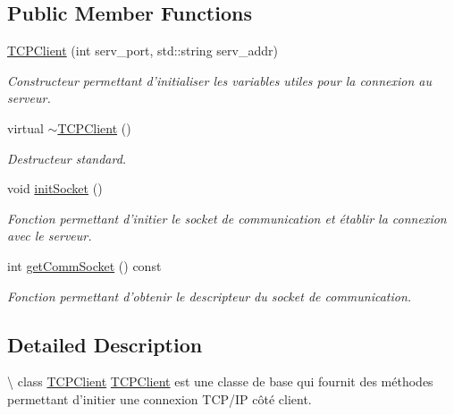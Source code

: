 \subsection*{Public Member Functions}
\begin{DoxyCompactItemize}
\item 
\hyperlink{classTCPClient_a57b75116cbba7c8b50e26e78642f0d56}{T\-C\-P\-Client} (int serv\-\_\-port, std\-::string serv\-\_\-addr)
\begin{DoxyCompactList}\small\item\em Constructeur permettant d'initialiser les variables utiles pour la connexion au serveur. \end{DoxyCompactList}\item 
\hypertarget{classTCPClient_a869a5b3319ca562d03cb4c59ebec4407}{virtual \hyperlink{classTCPClient_a869a5b3319ca562d03cb4c59ebec4407}{$\sim$\-T\-C\-P\-Client} ()}\label{classTCPClient_a869a5b3319ca562d03cb4c59ebec4407}

\begin{DoxyCompactList}\small\item\em Destructeur standard. \end{DoxyCompactList}\item 
\hypertarget{classTCPClient_a2c3b52fb65b17db330ce851a1111c221}{void \hyperlink{classTCPClient_a2c3b52fb65b17db330ce851a1111c221}{init\-Socket} ()}\label{classTCPClient_a2c3b52fb65b17db330ce851a1111c221}

\begin{DoxyCompactList}\small\item\em Fonction permettant d'initier le socket de communication et établir la connexion avec le serveur. \end{DoxyCompactList}\item 
\hypertarget{classTCPClient_a2acc4f58389c670672c6373b5375cb36}{int \hyperlink{classTCPClient_a2acc4f58389c670672c6373b5375cb36}{get\-Comm\-Socket} () const }\label{classTCPClient_a2acc4f58389c670672c6373b5375cb36}

\begin{DoxyCompactList}\small\item\em Fonction permettant d'obtenir le descripteur du socket de communication. \end{DoxyCompactList}\end{DoxyCompactItemize}


\subsection{Detailed Description}
\textbackslash{} class \hyperlink{classTCPClient}{T\-C\-P\-Client} \hyperlink{classTCPClient}{T\-C\-P\-Client} est une classe de base qui fournit des méthodes permettant d'initier une connexion T\-C\-P/\-I\-P côté client. 

